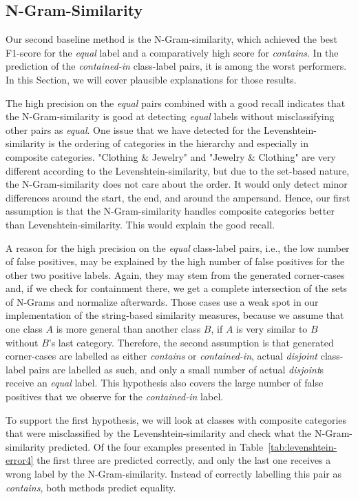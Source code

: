 \subsection{N-Gram-Similarity}

Our second baseline method is the N-Gram-similarity, which achieved the best F1-score for the \emph{equal} label and a comparatively
high score for \emph{contains}.
In the prediction of the \emph{contained-in} class-label pairs, it is among the worst performers.
In this Section, we will cover plausible explanations for those results.

The high precision on the \emph{equal} pairs combined with a good recall indicates that the N-Gram-similarity is good at detecting \emph{equal}
labels without misclassifying other pairs as \emph{equal}.
One issue that we have detected for the Levenshtein-similarity is the ordering of categories in the hierarchy and especially
in composite categories.
"Clothing \& Jewelry" and "Jewelry \& Clothing" are very different according to the Levenshtein-similarity, but due to
the set-based nature, the N-Gram-similarity does not care about the order.
It would only detect minor differences around the start, the end, and around the ampersand.
Hence, our first assumption is that the N-Gram-similarity handles composite categories better than Levenshtein-similarity.
This would explain the good recall.

A reason for the high precision on the \emph{equal} class-label pairs, i.e., the  low number of false positives, may be
explained by the high number of false positives for the other two positive labels.
Again, they may stem from the generated corner-cases and, if we check for containment there, we get a complete
intersection of the sets of N-Grams and normalize afterwards.
Those cases use a weak spot in our implementation of the string-based similarity measures, because we assume that one
class $A$ is more general than another class $B$, if $A$ is very similar to $B$ without $B$'s last category.
Therefore, the second assumption is that generated corner-cases are labelled as either \emph{contains} or \emph{contained-in},
actual \emph{disjoint} class-label pairs are labelled as such, and only a small number of actual \emph{disjoint}s receive an \emph{equal}
label.
This hypothesis also covers the large number of false positives that we observe for the \emph{contained-in} label.

To support the first hypothesis, we will look at classes with composite categories that were misclassified by the
Levenshtein-similarity and check what the N-Gram-similarity predicted.
Of the four examples presented in Table~\ref{tab:levenshtein-error4} the first three are predicted correctly, and only
the last one receives a wrong label by the N-Gram-similarity.
Instead of correctly labelling this pair as \emph{contains}, both methods predict equality.

